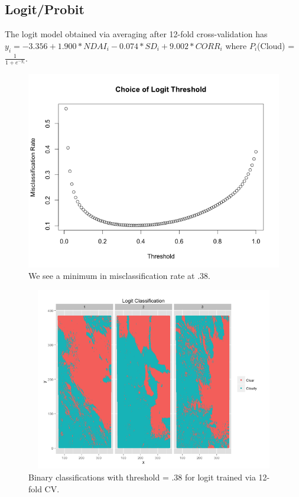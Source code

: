\documentclass{article}\usepackage[]{graphicx}\usepackage[]{color}
\begin{document}
\subsection{Logit/Probit}
The logit model obtained via averaging after 12-fold cross-validation has $y_i = -3.356 + 1.900 * NDAI_i - 0.074 * SD_i + 9.002 * CORR_i$ where $P_i$(Cloud) = $ \frac{1}{1 + e^{-y_i}}$. 

\begin{figure}[H]
\begin{center}
\includegraphics[scale = .35]{threshold.png}
\caption{We see a minimum in misclassification rate at .38.}
\end{center}
\end{figure}

\begin{figure}[H]
\includegraphics[width = 18cm, height = 8cm]{LogitClassification.png}
\caption{Binary classifications with threshold = .38 for logit trained via 12-fold CV.}
\end{figure}
\end{document}
